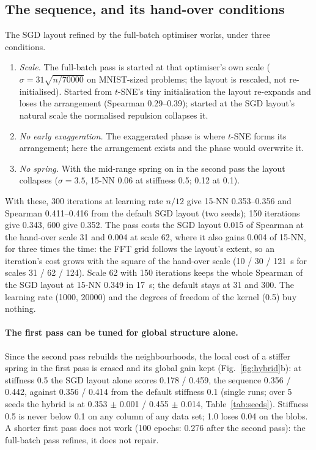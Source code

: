 \documentclass[11pt]{article}
\begin{document}
\subsection{The sequence, and its hand-over conditions}
The SGD layout refined by the full-batch optimiser works, under three conditions.
\begin{enumerate}[leftmargin=1.5em]
\item \emph{Scale.} The full-batch pass is started at that optimiser's own scale
  ($\sigma = 31\sqrt{n / 70000}$ on MNIST-sized problems; the layout is rescaled, not re-initialised).
  Started from $t$-SNE's tiny initialisation the layout re-expands and loses the arrangement (Spearman
  0.29--0.39); started at the SGD layout's natural scale the normalised repulsion collapses it.
\item \emph{No early exaggeration.} The exaggerated phase is where $t$-SNE forms its arrangement; here
  the arrangement exists and the phase would overwrite it.
\item \emph{No spring.} With the mid-range spring on in the second pass the layout collapses
  ($\sigma = 3.5$, 15-NN 0.06 at stiffness 0.5; 0.12 at 0.1).
\end{enumerate}
With these, 300 iterations at learning rate $n/12$ give 15-NN 0.353--0.356 and Spearman 0.411--0.416
from the default SGD layout (two seeds); 150 iterations give 0.343, 600 give 0.352. The pass costs the
SGD layout 0.015 of Spearman at the hand-over scale 31 and 0.004 at scale 62, where it also gains 0.004 of
15-NN, for three times the time: the FFT grid follows the layout's extent, so an iteration's cost grows
with the square of the hand-over scale (10 / 30 / 121~s for scales 31 / 62 / 124). Scale 62 with 150
iterations keeps the whole Spearman of the SGD layout at 15-NN 0.349 in 17~s; the default stays at 31 and
300. The learning rate (1000, 20000) and the degrees of freedom of the kernel (0.5) buy nothing.

\paragraph{The first pass can be tuned for global structure alone.} Since the second pass rebuilds the
neighbourhoods, the local cost of a stiffer spring in the first pass is erased and its global gain kept
(Fig.~\ref{fig:hybrid}b): at stiffness 0.5 the SGD layout alone scores 0.178 / 0.459, the sequence 0.356
/ 0.442, against 0.356 / 0.414 from the default stiffness 0.1 (single runs; over 5 seeds the hybrid
is at 0.353 $\pm$ 0.001 / 0.455 $\pm$ 0.014, Table~\ref{tab:seeds}). Stiffness 0.5 is never below 0.1 on any
column of any data set; 1.0 loses 0.04 on the blobs. A shorter first pass does not work (100 epochs:
0.276 after the second pass): the full-batch pass refines, it does not repair.
\end{document}
